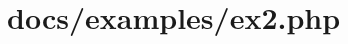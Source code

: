 \hypertarget{docs_2examples_2ex2_8php-example}{
\section{docs/examples/ex2.\-php}
}

\begin{DoxyCodeInclude}
\end{DoxyCodeInclude}
 